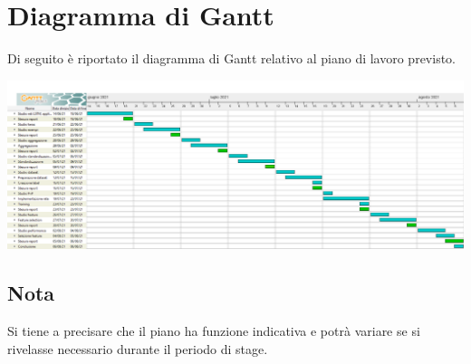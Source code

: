\section*{Diagramma di Gantt}
Di seguito è riportato il diagramma di Gantt relativo al piano di lavoro previsto.
\begin{center}
	\vspace{-0.3cm}
	\includegraphics[width=18cm]{img/gantt.png}
\end{center}

\subsection*{Nota}
\vspace{-0.3cm}
Si tiene a precisare che il piano ha funzione indicativa e potrà variare se si rivelasse necessario durante il periodo di stage.